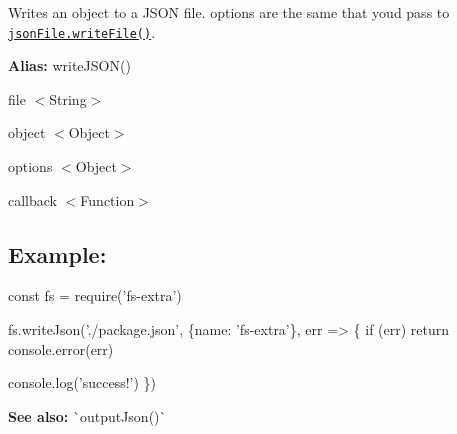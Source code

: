 Writes an object to a J\+S\+ON file. {\ttfamily options} are the same that you\textquotesingle{}d pass to \href{https://github.com/jprichardson/node-jsonfile#writefilefilename-options-callback}{\tt {\ttfamily json\+File.\+write\+File()}}.

{\bfseries Alias\+:} {\ttfamily write\+J\+S\+O\+N()}


\begin{DoxyItemize}
\item {\ttfamily file} {\ttfamily $<$String$>$}
\item {\ttfamily object} {\ttfamily $<$Object$>$}
\item {\ttfamily options} {\ttfamily $<$Object$>$}
\item {\ttfamily callback} {\ttfamily $<$Function$>$}
\end{DoxyItemize}

\subsection*{Example\+:}


\begin{DoxyCode}
const fs = require('fs-extra')

fs.writeJson('./package.json', \{name: 'fs-extra'\}, err => \{
  if (err) return console.error(err)

  console.log('success!')
\})
\end{DoxyCode}
 



{\bfseries See also\+:} \`{}output\+Json()\`{} 